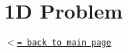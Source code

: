 \hypertarget{__cahnhilliard__cahnhilliard_1D}{}\section{1\+D Problem}\label{__cahnhilliard__cahnhilliard_1D}
\href{index.html}{\tt $<$= back to main page} 